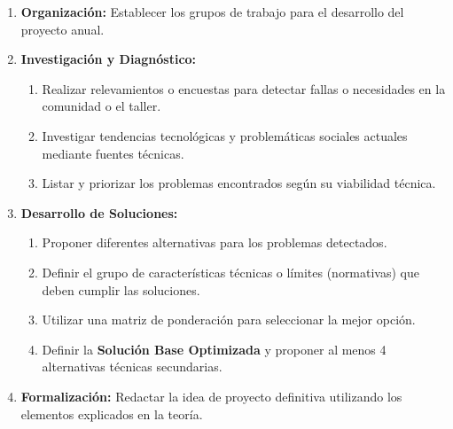 \documentclass[../main]{subfiles}
\begin{document}

\begin{enumerate}
  \item \textbf{Organización:} Establecer los grupos de trabajo para
    el desarrollo del proyecto anual.
  \item \textbf{Investigación y Diagnóstico:}
    \begin{enumerate}
      \item Realizar relevamientos o encuestas para detectar fallas o
        necesidades en la comunidad o el taller.
      \item Investigar tendencias tecnológicas y problemáticas
        sociales actuales mediante fuentes técnicas.
      \item Listar y priorizar los problemas encontrados según su
        viabilidad técnica.
    \end{enumerate}
  \item \textbf{Desarrollo de Soluciones:}
    \begin{enumerate}
      \item Proponer diferentes alternativas para los problemas detectados.
      \item Definir el grupo de características técnicas o límites
        (normativas) que deben cumplir las soluciones.
      \item Utilizar una matriz de ponderación para seleccionar la mejor opción.
      \item Definir la \textbf{Solución Base Optimizada} y proponer
        al menos 4 alternativas técnicas secundarias.
    \end{enumerate}
  \item \textbf{Formalización:} Redactar la idea de proyecto
    definitiva utilizando los elementos explicados en la teoría.
\end{enumerate}
\end{document}
